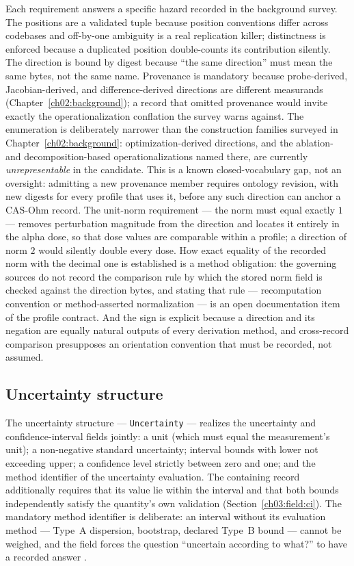 Each requirement answers a specific hazard recorded in the background survey. The positions are a validated tuple because position conventions differ across codebases and off-by-one ambiguity is a real replication killer; distinctness is enforced because a duplicated position double-counts its contribution silently. The direction is bound by digest because ``the same direction'' must mean the same bytes, not the same name. Provenance is mandatory because probe-derived, Jacobian-derived, and difference-derived directions are different measurands (Chapter~\ref{ch02:background}); a record that omitted provenance would invite exactly the operationalization conflation the survey warns against. The enumeration is deliberately narrower than the construction families surveyed in Chapter~\ref{ch02:background}: optimization-derived directions, and the ablation- and decomposition-based operationalizations named there, are currently \emph{unrepresentable} in the candidate. This is a known closed-vocabulary gap, not an oversight: admitting a new provenance member requires ontology revision, with new digests for every profile that uses it, before any such direction can anchor a CAS-Ohm record. The unit-norm requirement --- the norm must equal exactly $1$ --- removes perturbation magnitude from the direction and locates it entirely in the alpha dose, so that dose values are comparable within a profile; a direction of norm $2$ would silently double every dose. How exact equality of the recorded norm with the decimal one is established is a method obligation: the governing sources do not record the comparison rule by which the stored norm field is checked against the direction bytes, and stating that rule --- recomputation convention or method-asserted normalization --- is an open documentation item of the profile contract. And the sign is explicit because a direction and its negation are equally natural outputs of every derivation method, and cross-record comparison presupposes an orientation convention that must be recorded, not assumed.

\subsection{Uncertainty structure}\label{ch03:id:uncertainty}

The uncertainty structure --- \texttt{Uncertainty} --- realizes the uncertainty and confidence-interval fields jointly: a unit (which must equal the measurement's unit); a non-negative standard uncertainty; interval bounds with lower not exceeding upper; a confidence level strictly between zero and one; and the method identifier of the uncertainty evaluation. The containing record additionally requires that its value lie within the interval and that both bounds independently satisfy the quantity's own validation (Section~\ref{ch03:field:ci}). The mandatory method identifier is deliberate: an interval without its evaluation method --- Type~A dispersion, bootstrap, declared Type~B bound --- cannot be weighed, and the field forces the question ``uncertain according to what?'' to have a recorded answer \cite{gum}.

